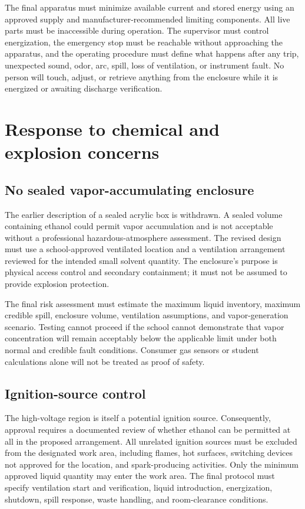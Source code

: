 \documentclass[11pt]{article}
\begin{document}
The final apparatus must minimize available current and stored energy using an approved supply and manufacturer-recommended limiting components. All live parts must be inaccessible during operation. The supervisor must control energization, the emergency stop must be reachable without approaching the apparatus, and the operating procedure must define what happens after any trip, unexpected sound, odor, arc, spill, loss of ventilation, or instrument fault. No person will touch, adjust, or retrieve anything from the enclosure while it is energized or awaiting discharge verification.

\section{Response to chemical and explosion concerns}

\subsection{No sealed vapor-accumulating enclosure}

The earlier description of a sealed acrylic box is withdrawn. A sealed volume containing ethanol could permit vapor accumulation and is not acceptable without a professional hazardous-atmosphere assessment. The revised design must use a school-approved ventilated location and a ventilation arrangement reviewed for the intended small solvent quantity. The enclosure's purpose is physical access control and secondary containment; it must not be assumed to provide explosion protection.

The final risk assessment must estimate the maximum liquid inventory, maximum credible spill, enclosure volume, ventilation assumptions, and vapor-generation scenario. Testing cannot proceed if the school cannot demonstrate that vapor concentration will remain acceptably below the applicable limit under both normal and credible fault conditions. Consumer gas sensors or student calculations alone will not be treated as proof of safety.

\subsection{Ignition-source control}

The high-voltage region is itself a potential ignition source. Consequently, approval requires a documented review of whether ethanol can be permitted at all in the proposed arrangement. All unrelated ignition sources must be excluded from the designated work area, including flames, hot surfaces, switching devices not approved for the location, and spark-producing activities. Only the minimum approved liquid quantity may enter the work area. The final protocol must specify ventilation start and verification, liquid introduction, energization, shutdown, spill response, waste handling, and room-clearance conditions.
\end{document}
